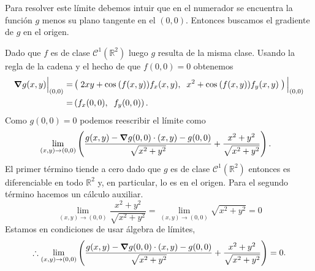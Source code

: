 
\begin{solution}
    Para resolver este límite debemos intuir que en el numerador se encuentra la función $g$ menos su plano tangente en el $(0,0)$. Entonces buscamos el gradiente de $g$ en el origen.

    Dado que $f$ es  de  clase \(\mathcal{C}^1(\mathbb{R}^2)\) luego $g$  resulta de la misma clase.  Usando la regla de la cadena  y el hecho de que $f(0,0)=0$ obtenemos
    \begin{align*}
        \grad g(x,y)\Big\rvert_{(0,0)}= & \left( \;2xy+\cos\:(f(x,y))f_x(x,y),\;\; x^2+\cos\:(f(x,y))f_y(x,y)\; \right) \Big\rvert_{(0,0)} \\
        =                                & \left( f_x(0,0),\;\; f_y(0,0) \right).
    \end{align*}
    Como $g(0,0)=0$ podemos reescribir el límite como
    \begin{align*}
         & \lim_{(x,y)\to(0,0)} \left(\frac{g(x,y)-\grad g(0,0)\cdot(x,y)-g(0,0)}{\sqrt{x^2+y^2}}+\frac{x^2+y^2}{\sqrt{x^2+y^2}}\right).
    \end{align*}
    El primer término tiende a cero dado que $g$ es  de  clase \(\mathcal{C}^1(\mathbb{R}^2)\)  entonces es diferenciable en todo $\mathbb{R}^{2}$ y,  en particular, lo es en el origen.  Para el segundo término hacemos un cálculo auxiliar.
    \[
        \lim_{(x,y)\to(0,0)}\frac{x^2+y^2}{\sqrt{x^2+y^2}}=\lim_{(x,y)\to(0,0)}\sqrt{x^2+y^2}=0
    \]
    Estamos en condiciones de usar \'algebra de l\'imites,
    \[
        \therefore \lim_{(x,y)\to(0,0)} \left(\frac{g(x,y)-\grad g(0,0)\cdot(x,y)-g(0,0)}{\sqrt{x^2+y^2}}+\frac{x^2+y^2}{\sqrt{x^2+y^2}}\right)=0.
    \]
\end{solution}


